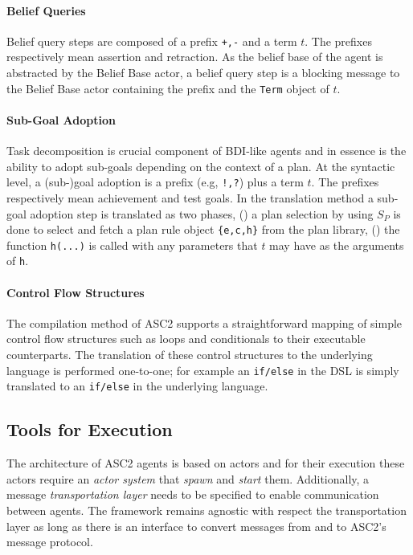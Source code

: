 \paragraph{Belief Queries}
Belief query steps are composed of a prefix \verb|+,-| and a term $t$. The prefixes respectively mean assertion and retraction. As the belief base of the agent is abstracted by the Belief Base actor, a belief query step is a blocking message to the Belief Base actor containing the prefix and the \verb+Term+ object of $t$.

\paragraph{Sub-Goal Adoption}
Task decomposition is crucial component of BDI-like agents and in essence is the ability to adopt sub-goals depending on the context of a plan. At the syntactic level, a (sub-)goal adoption is a prefix (e.g, \verb+!,?+) plus a term $t$. The prefixes respectively mean achievement and test goals. In the translation method a sub-goal adoption step is translated as two phases, () a plan selection by using $S_P$ is done to select and fetch a plan rule object \verb+{e,c,h}+ from the plan library, () the function \verb+h(...)+ is called with any parameters that $t$ may have as the arguments of \verb+h+.

\paragraph{Control Flow Structures}
The compilation method of ASC2 supports a  straightforward mapping of simple control flow structures such as loops and conditionals to their executable counterparts. The translation of these control structures to the underlying language is performed one-to-one; for example an \verb+if/else+ in the DSL is simply translated to an \verb+if/else+ in the underlying language.

\subsection{Tools for Execution}
The architecture of ASC2 agents is based on actors and for their execution these actors require an \textit{actor system} that \textit{spawn} and \textit{start} them. Additionally, a message \textit{transportation layer} needs to be specified to enable communication between agents. The framework remains agnostic with respect the transportation layer as long as there is an interface to convert messages from and to ASC2's message protocol.

